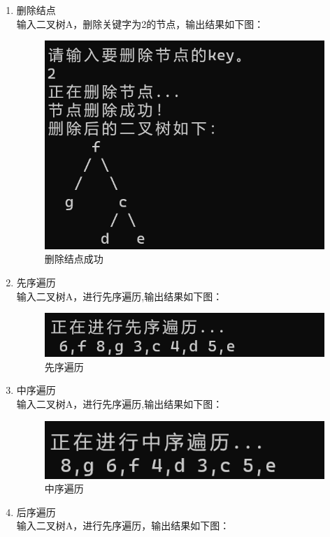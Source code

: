 \documentclass[supercite]{Experimental_Report}
\theoremstyle{definition}
\begin{document}
\begin{enumerate}
	\item 删除结点\\
	输入二叉树A，删除关键字为2的节点，输出结果如下图：
	\begin{figure}[H]
		\centering
		\includegraphics[width=0.8\linewidth]{images/删除节点成功.png}
		\caption{删除结点成功}
		\label{fig2-19}
	\end{figure}
	\item 先序遍历\\
		输入二叉树A，进行先序遍历,输出结果如下图：
	\begin{figure}[H]
		\centering
		\includegraphics[width=0.9\linewidth]{images/先序遍历.png}
		\caption{先序遍历}
		\label{fig2-20}
  \end{figure}
	\item 中序遍历\\
		输入二叉树A，进行先序遍历,输出结果如下图：
\begin{figure}[H]
	\centering
	\includegraphics[width=0.9\linewidth]{images/中序遍历.png}
	\caption{中序遍历}
	\label{fig2-21}
  \end{figure}
	\item 后序遍历\\
			输入二叉树A，进行先序遍历，输出结果如下图：
	\begin{figure}[H]

\end{figure}
\end{enumerate}
\end{document}
